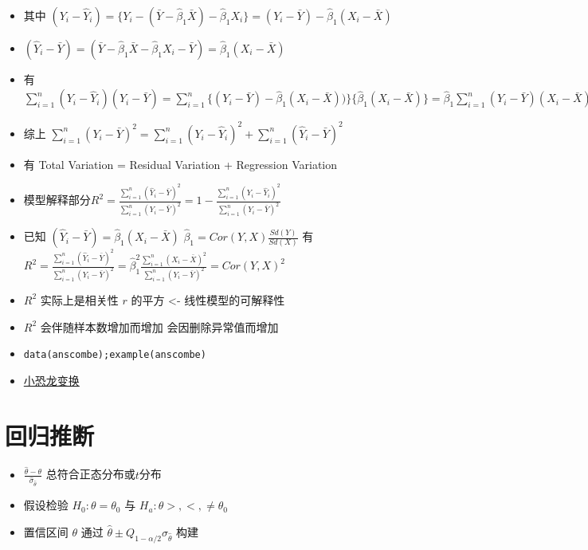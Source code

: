 \documentclass[]{book}
\providecommand{\tightlist}{%
  \setlength{\itemsep}{0pt}\setlength{\parskip}{0pt}}
\begin{document}
\begin{itemize}
\tightlist
\item
  其中 \((Y_i - \hat Y_i) = \{Y_i - (\bar Y - \hat \beta_1 \bar X) - \hat \beta_1 X_i\} = (Y_i - \bar Y) - \hat \beta_1 (X_i - \bar X)\)
\item
  \((\hat Y_i - \bar Y) = (\bar Y - \hat \beta_1 \bar X - \hat \beta_1 X_i - \bar Y )= \hat \beta_1 (X_i - \bar X)\)
\item
  有\(\sum_{i=1}^n (Y_i - \hat Y_i)(\hat Y_i - \bar Y) = \sum_{i=1}^n \{(Y_i - \bar Y) - \hat \beta_1 (X_i - \bar X))\}\{\hat \beta_1 (X_i - \bar X)\}=\hat \beta_1 \sum_{i=1}^n (Y_i - \bar Y)(X_i - \bar X) -\hat\beta_1^2\sum_{i=1}^n (X_i - \bar X)^2= \hat \beta_1^2 \sum_{i=1}^n (X_i - \bar X)^2-\hat\beta_1^2\sum_{i=1}^n (X_i - \bar X)^2 = 0\)
\item
  综上 \(\sum_{i=1}^n (Y_i - \bar Y)^2 = \sum_{i=1}^n (Y_i - \hat Y_i)^2 + \sum_{i=1}^n (\hat Y_i - \bar Y)^2\)
\item
  有 Total Variation = Residual Variation + Regression Variation
\item
  模型解释部分\(R^2 = \frac{\sum_{i=1}^n (\hat Y_i - \bar Y)^2}{\sum_{i=1}^n (Y_i - \bar Y)^2} = 1 - \frac{\sum_{i=1}^n (Y_i - \hat Y_i)^2}{\sum_{i=1}^n (Y_i - \bar Y)^2}\)
\item
  已知 \((\hat Y_i - \bar Y) = \hat \beta_1 (X_i - \bar X)\) \(\hat \beta_1 = Cor(Y, X)\frac{Sd(Y)}{Sd(X)}\) 有 \(R^2 = \frac{\sum_{i=1}^n (\hat Y_i - \bar Y)^2}{\sum_{i=1}^n (Y_i - \bar Y)^2}= \hat \beta_1^2 \frac{\sum_{i=1}^n(X_i - \bar X)^2}{\sum_{i=1}^n (Y_i - \bar Y)^2}= Cor(Y, X)^2\)
\item
  \(R^2\) 实际上是相关性 \(r\) 的平方 \textless{}- 线性模型的可解释性
\item
  \(R^2\) 会伴随样本数增加而增加 会因删除异常值而增加
\item
  \texttt{data(anscombe);example(anscombe)}
\item
  \href{https://www.autodeskresearch.com/publications/samestats}{小恐龙变换}
\end{itemize}

\section{回归推断}

\begin{itemize}
\tightlist
\item
  \(\frac{\hat \theta - \theta}{\hat \sigma_{\hat \theta}}\) 总符合正态分布或\(t\)分布
\item
  假设检验 \(H_0 : \theta = \theta_0\) 与 \(H_a : \theta >, <, \neq \theta_0\)
\item
  置信区间 \(\theta\) 通过 \(\hat \theta \pm Q_{1-\alpha/2} \hat \sigma_{\hat \theta}\) 构建
\end{itemize}
\end{document}
